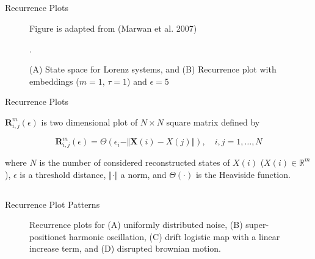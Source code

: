 \subsection{}
{

\begin{frame}{Recurrence Plots}
    \begin{figure}
		{Figure is adapted from (Marwan et al. 2007)}
	\caption{(A) State space for Lorenz systems, and 
		(B) Recurrence plot with embeddings ($m=1$, $\tau=1$) and $\epsilon=5$}. 
   \end{figure}

\end{frame}
}




{

\begin{frame}{Recurrence Plots}


$\mathbf{R}^{m}_{i,j} (\epsilon)$ is two dimensional plot of $N \times N$ square matrix
defined by


\begin{equation*}
\mathbf{R}^{m}_{i,j} (\epsilon) = 
\Theta ( \epsilon_i - \Vert \boldsymbol{X}(i) - X(j) \Vert ), 
\quad i,j=1,\dots,N
\end{equation*}

where $N$ is the number of considered reconstructed states of $X(i)$
($X(i) \in \mathbb{R}^m$), 
$\epsilon$ is a threshold distance, 
$ \Vert  \cdot \Vert$ a norm, 
and $\Theta( \cdot )$ is the Heaviside function.

\end{frame}
}




\subsection{}
{

\begin{frame}{Recurrence Plot Patterns}
    \begin{figure}
	\caption{Recurrence plots for (A) uniformly distributed noise,
		(B) super-positionet harmonic oscillation,
		(C) drift logistic map with a linear increase term, and
		(D) disrupted brownian motion.
		} 
   \end{figure}
	
\end{frame}
}



